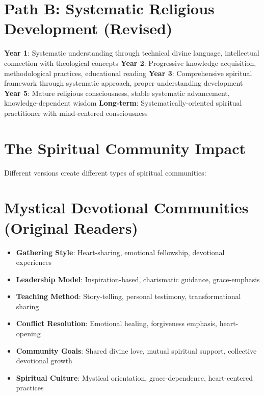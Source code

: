 \documentclass[11pt,twoside]{book}
\begin{document}
\section*{Path B: Systematic Religious Development (Revised)}
\label{sec:org9ea6d06}
\textbf{\textbf{Year 1}}: Systematic understanding through technical divine language, intellectual connection with theological concepts
\textbf{\textbf{Year 2}}: Progressive knowledge acquisition, methodological practices, educational reading
\textbf{\textbf{Year 3}}: Comprehensive spiritual framework through systematic approach, proper understanding development
\textbf{\textbf{Year 5}}: Mature religious consciousness, stable systematic advancement, knowledge-dependent wisdom
\textbf{\textbf{Long-term}}: Systematically-oriented spiritual practitioner with mind-centered consciousness
\section*{The Spiritual Community Impact}
\label{sec:org5f1ff53}

Different versions create different types of spiritual communities:
\section*{Mystical Devotional Communities (Original Readers)}
\label{sec:orgcd92bc0}
\begin{itemize}
\item \textbf{\textbf{Gathering Style}}: Heart-sharing, emotional fellowship, devotional experiences
\item \textbf{\textbf{Leadership Model}}: Inspiration-based, charismatic guidance, grace-emphasis
\item \textbf{\textbf{Teaching Method}}: Story-telling, personal testimony, transformational sharing
\item \textbf{\textbf{Conflict Resolution}}: Emotional healing, forgiveness emphasis, heart-opening
\item \textbf{\textbf{Community Goals}}: Shared divine love, mutual spiritual support, collective devotional growth
\item \textbf{\textbf{Spiritual Culture}}: Mystical orientation, grace-dependence, heart-centered practices
\end{itemize}
\end{document}
